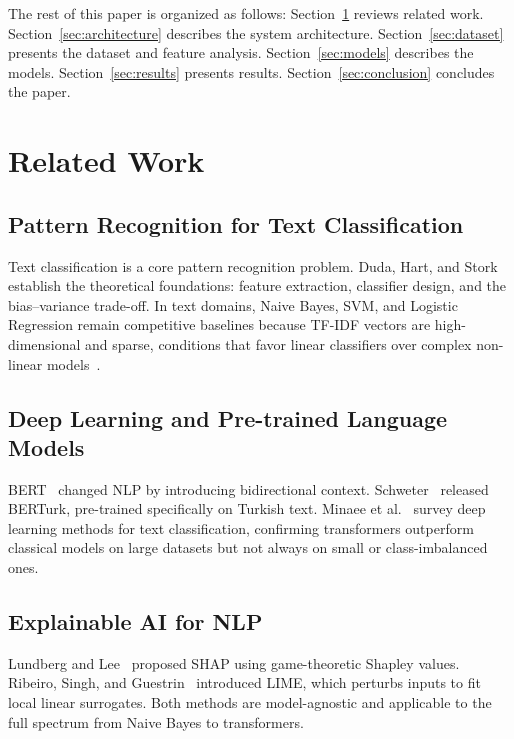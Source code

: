 \documentclass[conference]{IEEEtran}
\begin{document}
The rest of this paper is organized as follows:
Section~\ref{sec:related_work} reviews related work.
Section~\ref{sec:architecture} describes the system architecture.
Section~\ref{sec:dataset} presents the dataset and feature analysis.
Section~\ref{sec:models} describes the models.
Section~\ref{sec:results} presents results.
Section~\ref{sec:conclusion} concludes the paper.

\section{Related Work}
\label{sec:related_work}

\subsection{Pattern Recognition for Text Classification}

Text classification is a core pattern recognition problem. Duda, Hart, and
Stork~\cite{b_duda} establish the theoretical foundations: feature extraction,
classifier design, and the bias--variance trade-off. In text domains, Naive Bayes,
SVM, and Logistic Regression remain competitive baselines because TF-IDF vectors
are high-dimensional and sparse, conditions that favor linear classifiers
over complex non-linear models~\cite{b_duda}.

\subsection{Deep Learning and Pre-trained Language Models}

BERT~\cite{b2} changed NLP by introducing bidirectional context. Schweter~\cite{b7}
released BERTurk, pre-trained specifically on Turkish text. Minaee et al.~\cite{b10}
survey deep learning methods for text classification, confirming transformers outperform
classical models on large datasets but not always on small or class-imbalanced ones.

\subsection{Explainable AI for NLP}

Lundberg and Lee~\cite{b4} proposed SHAP using game-theoretic Shapley values.
Ribeiro, Singh, and Guestrin~\cite{b5} introduced LIME, which perturbs inputs to fit
local linear surrogates. Both methods are model-agnostic and applicable to the full
spectrum from Naive Bayes to transformers.
\end{document}
